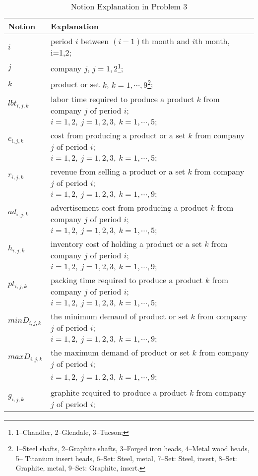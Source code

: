 \documentclass[12pt]{article}
\begin{document}
	\begin{longtable}{ll}
		\caption{Notion Explanation in Problem 3}
		\label{tab12}\\
			\hline	
			\hline
			Notion&Explanation\\
			\hline
			$i$ &period $i$ between $(i-1)$th month and $i$th month, i=1,2;\\
			$j$ & company $j$, $j=1,2$\footnote[1]{1--Chandler, 2--Glendale, 3--Tucson;};\\
			$k$ & product or set $k$, $k=1,\cdots,9$\footnote[2]{1--Steel shafts, 2--Graphite shafts, 3--Forged iron heads, 4--Metal wood heads, 5-- Titanium insert heads, 6--Set: Steel, metal, 7--Set: Steel, insert, 8--Set: Graphite, metal, 9--Set: Graphite, insert.}; \\
			$lbt_{i,j,k}$&labor time required to produce a product $k$ from company $j$ of period $i$;\\	
			&$i=1,2,\ j=1,2,3,\ k=1,\cdots,5;$\\
			$c_{i,j,k}$&cost from producing a product or a set $k$ from company $j$ of period $i$;\\
			&$i=1,2,\ j=1,2,3,\ k=1,\cdots,5;$\\
			$r_{i,j,k}$&revenue from selling a product or a set $k$ from company $j$ of period $i$;\\
			&$i=1,2,\ j=1,2,3,\ k=1,\cdots,9;$\\
			$ad_{i,j,k}$& advertisement cost from producing a product $k$ from company $j$ of period $i$;\\
			&$i=1,2,\ j=1,2,3,\ k=1,\cdots,5;$\\
			$h_{i,j,k}$&inventory cost of holding a product or a set $k$ from company $j$ of period $i$;\\
			&$i=1,2,\ j=1,2,3,\ k=1,\cdots,9;$\\
			$pt_{i,j,k}$&packing time required to produce a product $k$ from company $j$ of period $i$;\\
			&$i=1,2,\ j=1,2,3,\ k=1,\cdots,5;$\\
			$minD_{i,j,k}$& the minimum demand of  product or set $k$ from company $j$ of period $i$;\\
			&$i=1,2,\ j=1,2,3,\ k=1,\cdots,9;$\\
			$maxD_{i,j,k}$& the maximum demand of  product or set $k$ from company $j$ of period $i$;\\\
			&$i=1,2,\ j=1,2,3,\ k=1,\cdots,9;$\\
			$g_{i,j,k}$&graphite required to produce a product $k$ from company $j$ of period $i$;\\

\end{longtable}
\end{document}
